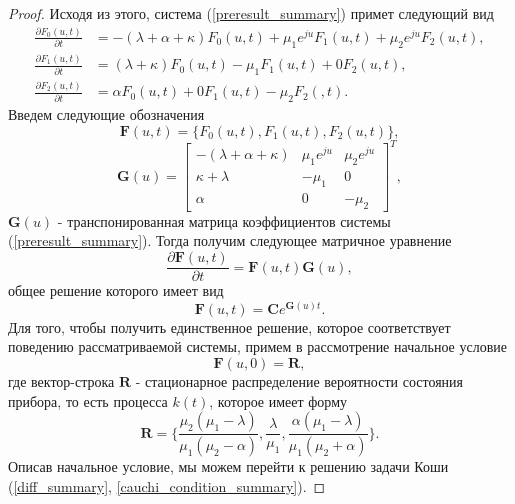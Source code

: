 \begin{proof}
	Исходя из этого, система (\ref{preresult_summary}) примет следующий вид
	\begin{equation} \label{result_summary}
		\begin{split}
			\frac{{\partial F_{0}(u,t)}}{{\partial t}} &= -(\lambda + \alpha+ \kappa)F_{0}(u,t) + \mu_{1} e^{ju}F_{1}(u,t) + \mu_{2}e^{ju}F_{2}(u,t) ,
			\\
			\frac{{\partial F_{1}(u,t)}}{{\partial t}} &= (\lambda + \kappa)F_{0}(u,t) -  
			\mu_{1}F_{1}(u,t) +  0F_{2}(u,t) ,
			\\
			\frac{{\partial F_{2}(u,t)}}{{\partial t}} &= \alpha F_{0}(u,t)   +  0F_{1}(u,t) - \mu_{2}F_{2}(,t).
		\end{split}
	\end{equation}  
	Введем следующие обозначения
	\begin{equation*}
		\boldsymbol{F}(u,t) = \{F_{0}(u,t),F_{1}(u,t),F_{2}(u,t)\},
	\end{equation*}  
	\begin{equation*}
		\boldsymbol{G}(u)=\begin{bmatrix}
			-(\lambda + \alpha + \kappa) & \mu_{1}e^{ju} &  \mu_{2}e^{ju}\\
			\kappa+\lambda & -\mu_{1} & 0\\
			\alpha & 	0 &	-\mu_{2}
		\end{bmatrix}^{T},
	\end{equation*}
	$\boldsymbol{G}(u)$ - транспонированная матрица коэффициентов системы (\ref{preresult_summary}).
	Тогда получим следующее матричное уравнение
	\begin{equation*}
		\frac{{\partial \boldsymbol{F}(u,t)}}{{\partial t}} =\boldsymbol{F}(u,t)\boldsymbol{G}(u),
	\end{equation*}
	общее решение которого имеет вид
	\begin{equation} \label{diff_summary}
		\boldsymbol{F}(u,t)=\boldsymbol{C}e^{\boldsymbol{G}(u)t}.
	\end{equation}
	Для того, чтобы получить единственное решение, которое соответствует поведению рассматриваемой системы, примем в рассмотрение начальное условие
	\begin{equation} \label{cauchi_condition_summary}
		\boldsymbol{F}(u,0)=\boldsymbol{R},
	\end{equation}
	где вектор-строка $\boldsymbol{R}$ - стационарное распределение вероятности состояния прибора, то есть процесса $k(t)$, которое имеет форму \cite{nazarov2017asymptotic}
	\begin{equation*}
		\boldsymbol{R}=\{\frac{\mu_{2}(\mu_{1} - \lambda)}{\mu_{1}(\mu_{2} - \alpha)},\frac{\lambda}{\mu_{1}},\frac{\alpha(\mu_{1} - \lambda)}{\mu_{1}(\mu_{2} + \alpha)}\}.
	\end{equation*}
	Описав начальное условие, мы можем перейти к решению задачи Коши (\ref{diff_summary}, \ref{cauchi_condition_summary}).
	

\end{proof}
